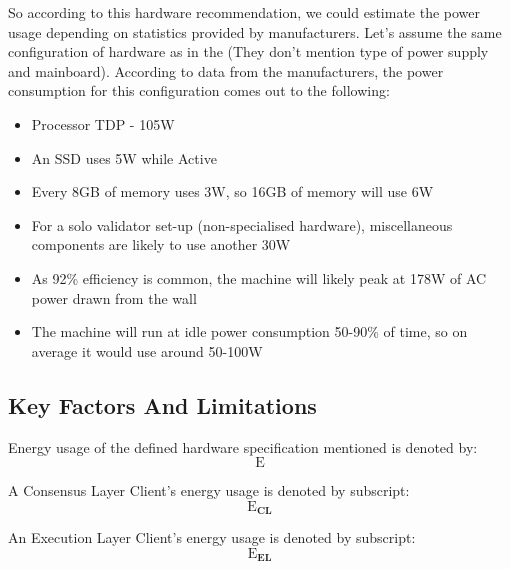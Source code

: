 So according to this hardware recommendation, we could estimate the power usage depending on statistics provided by manufacturers. Let's assume the same configuration of hardware as in the \cite{CCRI:Network} (They don't mention type of power supply and mainboard).  According to data from the manufacturers, the power consumption for this configuration comes out to the following: 

\begin{itemize}
    \item Processor TDP - 105W
    
    \item An SSD uses 5W while Active
    
    \item Every 8GB of memory uses 3W, so 16GB of memory will use 6W
    
    \item For a solo validator set-up (non-specialised hardware), miscellaneous components are likely to use another 30W
    
    \item As 92\% efficiency is common, the machine will likely peak at 178W of AC power drawn from the wall
    
    \item The machine will run at idle power consumption 50-90\% of time, so on average it would use around 50-100W
    
\end{itemize}







\subsection {Key Factors And Limitations}


Energy usage of the defined hardware specification mentioned is denoted by:
\begin{equation*}
    \boldsymbol{\mathrm{E}}
\end{equation*} 

A Consensus Layer Client's energy usage is denoted by subscript:
\begin{equation*}
    \boldsymbol{\mathrm{E}_{CL}}
\end{equation*}

An Execution Layer Client's energy usage is denoted by subscript:
\begin{equation*}
    \boldsymbol{\mathrm{E}_{EL}}
\end{equation*}
 
